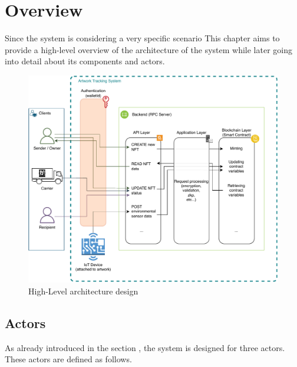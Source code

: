 \section{Overview}
Since the system is considering a very specific scenario This chapter aims to provide a high-level overview of the architecture of the system while later going into detail about its components and actors.

\begin{figure}[ht]
    \centering
    \includegraphics[height=0.5\textheight, keepaspectratio]{diagrams/Architecture.drawio.pdf}
    \caption{High-Level architecture design}
    \label{fig:architecture}
\end{figure}

\subsection{Actors}
As already introduced in the section , the system is designed for three actors. These actors are defined as follows.

